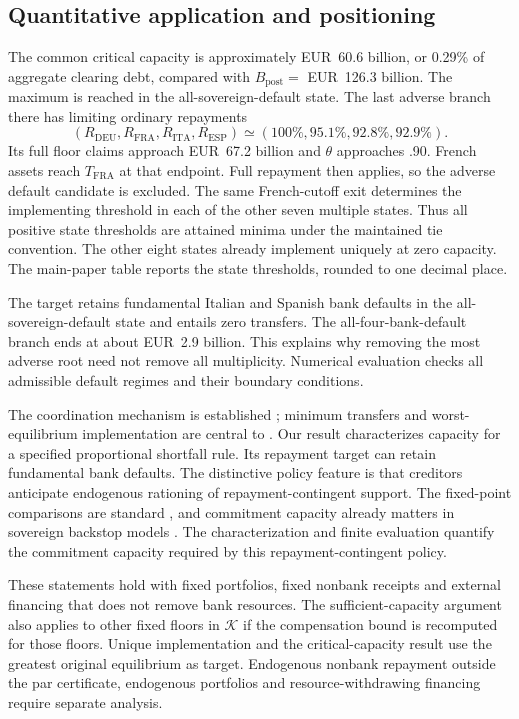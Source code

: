 \subsection{Quantitative application and positioning}
The common critical capacity is approximately EUR~60.6 billion, or 0.29\% of aggregate clearing debt, compared with $B_{\mathrm{post}}=$ EUR~126.3 billion. The maximum is reached in the all-sovereign-default state. The last adverse branch there has limiting ordinary repayments
\[
 (R_{\mathrm{DEU}},R_{\mathrm{FRA}},R_{\mathrm{ITA}},R_{\mathrm{ESP}})
 \simeq(100\%,95.1\%,92.8\%,92.9\%).
\]
Its full floor claims approach EUR~67.2 billion and $\theta$ approaches .90. French assets reach $T_{\mathrm{FRA}}$ at that endpoint. Full repayment then applies, so the adverse default candidate is excluded. The same French-cutoff exit determines the implementing threshold in each of the other seven multiple states. Thus all positive state thresholds are attained minima under the maintained tie convention. The other eight states already implement uniquely at zero capacity. The main-paper table reports the state thresholds, rounded to one decimal place.

The target retains fundamental Italian and Spanish bank defaults in the all-sovereign-default state and entails zero transfers. The all-four-bank-default branch ends at about EUR~2.9 billion. This explains why removing the most adverse root need not remove all multiplicity. Numerical evaluation checks all admissible default regimes and their boundary conditions.

The coordination mechanism is established \citep{JacksonPernoud2021}; minimum transfers and worst-equilibrium implementation are central to \citet{JacksonPernoud2024}. Our result characterizes capacity for a specified proportional shortfall rule. Its repayment target can retain fundamental bank defaults. The distinctive policy feature is that creditors anticipate endogenous rationing of repayment-contingent support. The fixed-point comparisons are standard \citep{Tarski1955}, and commitment capacity already matters in sovereign backstop models \citep{RochUhlig2018}. The characterization and finite evaluation quantify the commitment capacity required by this repayment-contingent policy.

These statements hold with fixed portfolios, fixed nonbank receipts and external financing that does not remove bank resources. The sufficient-capacity argument also applies to other fixed floors in $\mathcal K$ if the compensation bound is recomputed for those floors. Unique implementation and the critical-capacity result use the greatest original equilibrium as target. Endogenous nonbank repayment outside the par certificate, endogenous portfolios and resource-withdrawing financing require separate analysis.
